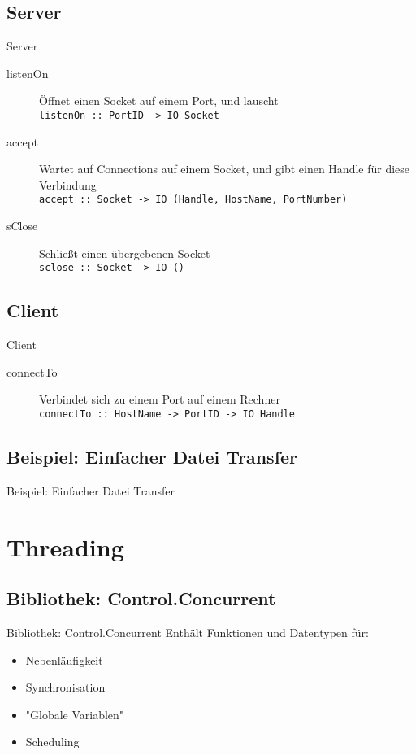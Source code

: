 \documentclass{beamer}
\begin{document}
\subsection{Server}
\begin{frame}{Server}
\begin{description}
\item[listenOn] Öffnet einen Socket auf einem Port, und lauscht \\ \texttt{listenOn :: PortID -> IO Socket}
\item[accept] Wartet auf Connections auf einem Socket, und gibt einen Handle für diese Verbindung \\ \texttt{accept :: Socket -> IO (Handle, HostName, PortNumber)}
\item[sClose] Schließt einen übergebenen Socket \\ \texttt{sclose :: Socket -> IO ()}
\end{description}
\end{frame}

\subsection{Client}
\begin{frame}{Client}
\begin{description}
\item[connectTo] Verbindet sich zu einem Port auf einem Rechner \\ \texttt{connectTo :: HostName -> PortID -> IO Handle}
\end{description}
\end{frame}

\subsection{Beispiel: Einfacher Datei Transfer}
\begin{frame}{Beispiel: Einfacher Datei Transfer}
\end{frame}

\section{Threading}
\subsection{Bibliothek: Control.Concurrent}
\begin{frame}[<+->]{Bibliothek: Control.Concurrent}
Enthält Funktionen und Datentypen für:
\begin{itemize}
\item Nebenläufigkeit
\item Synchronisation
\item "Globale Variablen"
\item Scheduling
\end{itemize}
\end{frame}
\end{document}
